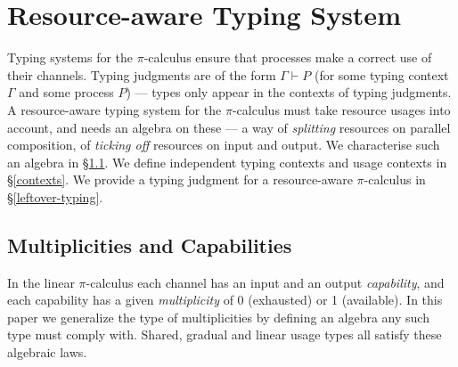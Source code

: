 \documentclass[a4paper,UKenglish,cleveref, autoref, thm-restate,authorcolumns]{lipics-v2019}
\theoremstyle{definition}
\newcommand{\picalc}{$\pi$-calculus}
\begin{document}
\section{Resource-aware Typing System}
\label{type-system}

Typing systems for the \picalc{} ensure that processes make a correct use of their channels.
Typing judgments are of the form $\Gamma \vdash P$ (for some typing context $\Gamma$ and some process $P$) --- types only appear in the contexts of typing judgments.
A resource-aware typing system for the \picalc{} must take resource usages into account, and needs an algebra on these --- a way of \emph{splitting} resources on parallel composition, of \emph{ticking off} resources on input and output.
We characterise such an algebra in \S \ref{multiplicities}.
We define independent typing contexts and usage contexts in \S \ref{contexts}.
We provide a typing judgment for a resource-aware \picalc{} in \S \ref{leftover-typing}.

\subsection{Multiplicities and Capabilities}
\label{multiplicities}

In the linear \picalc{} each channel has an input and an output \emph{capability}, and each capability has a given \emph{multiplicity} of 0 (exhausted) or 1 (available).
In this paper we generalize the type of multiplicities by defining an algebra any such type must comply with.
Shared, gradual and linear usage types all satisfy these algebraic laws.
\end{document}
